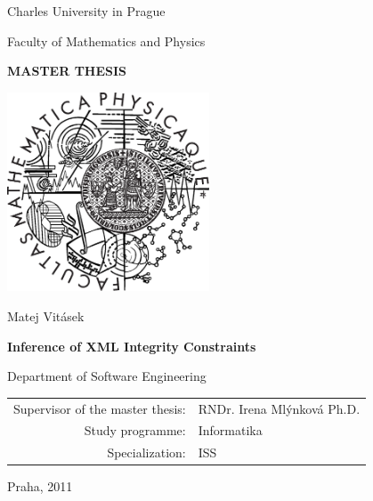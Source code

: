 \documentclass[a4paper,12pt,oneside]{report}
\def\mfauthor{Matej Vitásek}
\def\mfadvisor{RNDr. Irena Mlýnková Ph.D.}
\def\mfplacedate{Praha, 2011}
\begin{document}

\pagestyle{empty}
\begin{center}

\large

Charles University in Prague

\medskip

Faculty of Mathematics and Physics

\vfill

{\bf\Large MASTER THESIS}

\vfill

\centerline{\mbox{\includegraphics[width=60mm]{logo.eps}}}

\vfill
\vspace{5mm}

{\LARGE \mfauthor}

\vspace{15mm}

{\LARGE\bfseries Inference of XML Integrity Constraints}

\vfill

Department of Software Engineering

\vfill

\begin{tabular}{rl}

Supervisor of the master thesis: & 	\mfadvisor \\
\noalign{\vspace{2mm}}
Study programme: & Informatika \\
\noalign{\vspace{2mm}}
Specialization: & ISS \\
\end{tabular}

\vfill

\mfplacedate 

\end{center}
\end{document}
